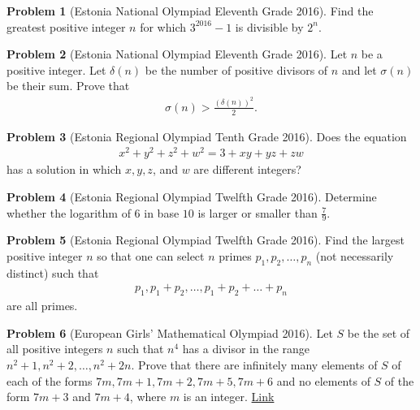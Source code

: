 \documentclass[]{article}
\theoremstyle{definition}
\newtheorem{problem}{Problem}
\begin{document}
\begin{problem}[Estonia National Olympiad Eleventh Grade 2016]
	Find the greatest positive integer $n$ for which $3^{2016} - 1$ is divisible by $2^n$.
\end{problem}


\begin{problem}[Estonia National Olympiad Eleventh Grade 2016]
	Let $n$ be a positive integer. Let $\delta(n)$ be the number of positive divisors of $n$ and let $\sigma(n)$ be their sum. Prove that
		\begin{align*}
			\sigma(n) > \frac{\left(\delta(n)\right)^2}{2}.
		\end{align*}
\end{problem}


\begin{problem}[Estonia Regional Olympiad Tenth Grade 2016]
	Does the equation
		\begin{align*}
			x^2+y^2+z^2+w^2=3 + xy + yz + zw
		\end{align*}
	has a solution in which $x, y, z$, and $w$ are different integers?
\end{problem}

\begin{problem}[Estonia Regional Olympiad Twelfth Grade 2016]
	Determine whether the logarithm of $6$ in base $10$ is larger or smaller than $\frac{7}{9}$.
\end{problem}


\begin{problem}[Estonia Regional Olympiad Twelfth Grade 2016]
	Find the largest positive integer $n$ so that one can select $n$ primes $p_1, p_2, \dots, p_n$ (not necessarily distinct) such that
		\begin{align*}
			p_1, p_1+p_2, \dots, p_1+p_2+\dots+p_n
		\end{align*}
	are all primes.
\end{problem}




\begin{problem}[European Girls' Mathematical Olympiad 2016]
	Let $S$ be the set of all positive integers $n$ such that $n^4$ has a divisor in the range $n^2 +1, n^2 + 2,\dots,n^2 + 2n$. Prove that there are infinitely many elements of $S$ of each of the forms $7m, 7m+1, 7m+2, 7m+5, 7m+6$ and no elements of $S$ of the form $7m+3$ and $7m+4$, where $m$ is an integer. \hfill \href{http://artofproblemsolving.com/community/c6h1227241p6177824}{Link}
\end{problem}
\end{document}
